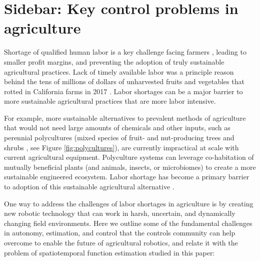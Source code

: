 \documentclass[letterpaper,12pt,peerreviewca,draftcls]{IEEEtran}
\begin{document}
\section[How can control engineers help agriculture?]{Sidebar: Key control problems in agriculture}\label{sb:ag}


Shortage of qualified human labor is a key challenge facing farmers \cite{richards2018immigration,hertz2013there}, leading to smaller profit margins, and preventing the adoption of truly sustainable agricultural practices. Lack of timely available labor was a principle reason behind the tens of millions of dollars of unharvested fruits and vegetables that rotted in California farms in 2017 \cite{guthman2017paradoxes,RN4026}.  Labor shortages can be a major barrier to more sustainable agricultural practices that are more labor intensive.

For example, more sustainable alternatives to prevalent methods of agriculture that would not need large amounts of chemicals and other inputs, such as perennial polycultures (mixed species of fruit- and nut-producing trees and shrubs \cite{lovell2017temperate}, see Figure \ref{fig:polycultures}), are currently impractical at scale with current agricultural equipment. Polyculture systems can leverage co-habitation of mutually beneficial plants (and animals, insects, or microbiomes) to create a more sustainable engineered ecosystem. Labor shortage has become a primary barrier to adoption of this sustainable agricultural alternative \cite{RN4017,RN4018}.  


One way to address the challenges of labor shortages in agriculture is by creating new robotic technology that can work in harsh, uncertain, and dynamically changing field environments. 
Here we outline some of the fundamental challenges in autonomy, estimation, and control that the controls community can help overcome to enable the future of agricultural robotics, and relate it with the problem of spatiotemporal function estimation studied in this paper:
\end{document}
